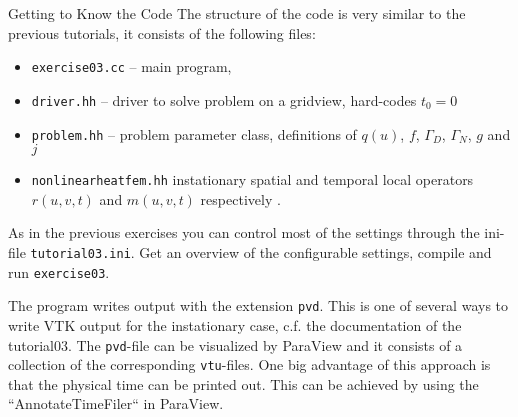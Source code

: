 \documentclass[12pt,a4paper]{article}
\begin{document}
\begin{Exercise}{Getting to Know the Code}
  The structure of the code is very similar to the previous tutorials,
  it consists of the following files:
  \begin{itemize}
  \item \lstinline!exercise03.cc! -- main program,
  \item \lstinline!driver.hh! -- driver to solve problem on a gridview,
    hard-codes $t_0=0$
  \item \lstinline!problem.hh! -- problem parameter class, definitions
    of $q(u)$, $f$, $\Gamma_D$, $\Gamma_N$, $g$ and $j$
  \item \lstinline!nonlinearheatfem.hh! instationary spatial and
    temporal local operators $r(u,v,t)$ and $m(u,v,t)$ respectively .
  \end{itemize}
  As in the previous exercises you can control most of the settings
  through the ini-file \lstinline!tutorial03.ini!. Get an overview of
  the configurable settings, compile and run \lstinline!exercise03!.

  The program writes output with the extension \lstinline!pvd!. This is one
  of several ways to write VTK output for the instationary case,
  c.f. the documentation of the tutorial03. The \lstinline!pvd!-file can
  be visualized by ParaView and it consists of a collection of the
  corresponding \lstinline!vtu!-files.
  One big advantage of this approach is that the physical time can be
  printed out. This can be achieved by using the ``AnnotateTimeFiler``
  in ParaView.

\end{Exercise}
\end{document}
